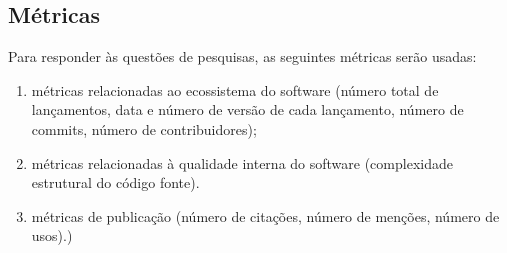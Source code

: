 

\subsection{Métricas}

Para responder às questões de pesquisas, as seguintes métricas serão usadas:
\begin{enumerate}
\item métricas relacionadas ao ecossistema do software (número
total de lançamentos, data e número de versão de cada lançamento, número de
commits, número de contribuidores); %
\item métricas relacionadas à qualidade interna do software (complexidade estrutural do código fonte). %
\item métricas de publicação (número de citações, número de menções, número de usos).) %
\end{enumerate}





